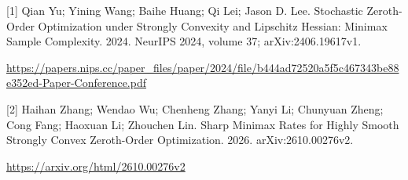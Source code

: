 \documentclass[10pt,a4paper]{article}
\begin{document}
[1] Qian Yu; Yining Wang; Baihe Huang; Qi Lei; Jason D. Lee. Stochastic Zeroth-Order Optimization under Strongly Convexity and Lipschitz Hessian: Minimax Sample Complexity. 2024. NeurIPS 2024, volume 37; arXiv:2406.19617v1.



\url{https://papers.nips.cc/paper_files/paper/2024/file/b444ad72520a5f5c467343be88e352ed-Paper-Conference.pdf}



[2] Haihan Zhang; Wendao Wu; Chenheng Zhang; Yanyi Li; Chunyuan Zheng; Cong Fang; Haoxuan Li; Zhouchen Lin. Sharp Minimax Rates for Highly Smooth Strongly Convex Zeroth-Order Optimization. 2026. arXiv:2610.00276v2.



\url{https://arxiv.org/html/2610.00276v2}
\end{document}
